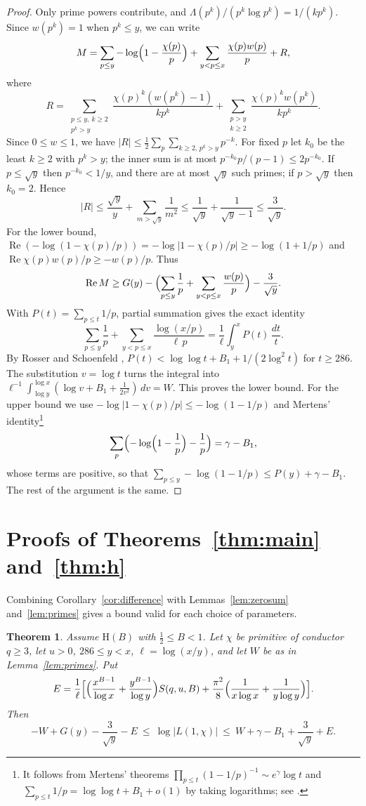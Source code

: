 \documentclass[11pt]{amsart}
\newtheorem{theorem}{Theorem}[section]
\theoremstyle{definition}
\theoremstyle{remark}
\renewcommand{\Re}{\operatorname{Re}}
\begin{document}
\begin{proof}
Only prime powers contribute, and $\Lambda(p^k)/(p^k\log p^k)=1/(kp^k)$. Since $w(p^k)=1$ when $p^k\le y$, we can write
\[
M=\sum_{p\le y}-\log\Bigl(1-\frac{\chi(p)}p\Bigr)+\sum_{y<p\le x}\frac{\chi(p)w(p)}p+R,
\]
where
\[
R=\sum_{\substack{p\le y,\ k\ge2\\ p^k>y}}\frac{\chi(p)^k(w(p^k)-1)}{kp^k}+\sum_{\substack{p>y\\ k\ge2}}\frac{\chi(p)^kw(p^k)}{kp^k}.
\]
Since $0\le w\le1$, we have $|R|\le\frac12\sum_p\sum_{k\ge2,\,p^k>y}p^{-k}$. For fixed $p$ let $k_0$ be the least $k\ge2$ with $p^k>y$; the inner sum is at most $p^{-k_0}p/(p-1)\le2p^{-k_0}$. If $p\le\sqrt y$ then $p^{-k_0}<1/y$, and there are at most $\sqrt y$ such primes; if $p>\sqrt y$ then $k_0=2$. Hence
\[
|R|\le\frac{\sqrt y}{y}+\sum_{m>\sqrt y}\frac1{m^2}\le\frac1{\sqrt y}+\frac1{\sqrt y-1}\le\frac3{\sqrt y}.
\]
For the lower bound, $\Re(-\log(1-\chi(p)/p))=-\log|1-\chi(p)/p|\ge-\log(1+1/p)$ and $\Re\chi(p)w(p)/p\ge-w(p)/p$. Thus
\[
\Re M\ge G(y)-\Bigl(\sum_{p\le y}\frac1p+\sum_{y<p\le x}\frac{w(p)}p\Bigr)-\frac3{\sqrt y}.
\]
With $P(t)=\sum_{p\le t}1/p$, partial summation gives the exact identity
\[
\sum_{p\le y}\frac1p+\sum_{y<p\le x}\frac{\log(x/p)}{\ell\,p}=\frac1\ell\int_y^x P(t)\,\frac{dt}t .
\]
By Rosser and Schoenfeld \cite[Theorem 5]{RS62}, $P(t)<\log\log t+B_1+1/(2\log^2t)$ for $t\ge286$. The substitution $v=\log t$ turns the integral into $\ell^{-1}\int_{\log y}^{\log x}(\log v+B_1+\tfrac1{2v^2})\,dv=W$. This proves the lower bound. For the upper bound we use $-\log|1-\chi(p)/p|\le-\log(1-1/p)$ and Mertens' identity\footnote{It follows from Mertens' theorems $\prod_{p\le t}(1-1/p)^{-1}\sim e^\gamma\log t$ and $\sum_{p\le t}1/p=\log\log t+B_1+o(1)$ by taking logarithms; see \cite[Theorem 2.7]{MV07}.}
\[
\sum_p\Bigl(-\log\Bigl(1-\frac1p\Bigr)-\frac1p\Bigr)=\gamma-B_1 ,
\]
whose terms are positive, so that $\sum_{p\le y}-\log(1-1/p)\le P(y)+\gamma-B_1$. The rest of the argument is the same.
\end{proof}

\section{Proofs of Theorems~\ref{thm:main} and~\ref{thm:h}}\label{sec:proofs}

Combining Corollary~\ref{cor:difference} with Lemmas~\ref{lem:zerosum} and~\ref{lem:primes} gives a bound valid for each choice of parameters.

\begin{theorem}\label{thm:general}
Assume $\mathrm H(B)$ with $\tfrac12\le B<1$. Let $\chi$ be primitive of conductor $q\ge3$, let $u>0$, $286\le y<x$, $\ell=\log(x/y)$, and let $W$ be as in Lemma~\ref{lem:primes}. Put
\[
E=\frac1\ell\Bigl[\Bigl(\frac{x^{B-1}}{\log x}+\frac{y^{B-1}}{\log y}\Bigr)S(q,u,B)+\frac{\pi^2}{8}\Bigl(\frac1{x\log x}+\frac1{y\log y}\Bigr)\Bigr].
\]
Then
\[
-W+G(y)-\frac3{\sqrt y}-E\ \le\ \log|L(1,\chi)|\ \le\ W+\gamma-B_1+\frac3{\sqrt y}+E .
\]
\end{theorem}
\end{document}
